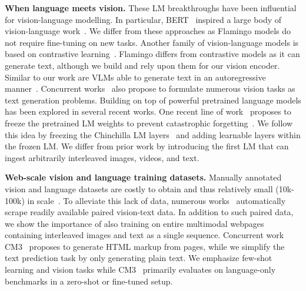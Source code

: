 \textbf{When language meets vision.} These LM breakthroughs have been influential for vision-language modelling. In particular, BERT~\citep{bert} inspired a large body of vision-language work~\citep{lu2019vilbert,su2019vl,chen2020uniter,hendricks2021decoupling,wang2021vlmo,li2020oscar,tan2019lxmert,zhu2020actbert,wang2021ufo,li2020hero,gan2020large,fu2021violet,zellers2021merlot,zellers2022merlot,singh2021flava,sun2019videobert}. We differ from these approaches as Flamingo models do not require fine-tuning on new tasks. Another family of vision-language models is based on contrastive learning~\citep{alayrac2020self,clip,align,zhai2021lit,pham2021combined,miech2020end,bain2021frozen,yuan2021florence,li2021align,yao2021filip,jain2021mural}. Flamingo differs from contrastive models as it can generate text, although we build and rely upon them for our vision encoder. Similar to our work are VLMs able to generate text in an autoregressive manner~\citep{vinyals2015show,donahue2015long,luo2020univl,hu2021scaling,dai2022}. Concurrent works~\citep{wang2021simvlm,cho2021unifying,wang2022unifying,zhu2021uni,li2022blip} also propose to formulate numerous vision tasks as text generation problems. Building on top of powerful pretrained language models has been explored in several recent works. One recent line of work~\citep{tsimpoukelli2021multimodal,eichenberg2021magma,mokady2021clipcap,luo2022vc,yang2021empirical,zeng2022socraticmodels} proposes to freeze the pretrained LM weights to prevent catastrophic forgetting~\citep{mccloskey1989catastrophic}. We follow this idea by freezing the Chinchilla LM layers~\citep{chinchilla} and adding learnable layers within the frozen LM. We differ from prior work by introducing the first LM that can ingest arbitrarily interleaved images, videos, and text.

\textbf{Web-scale vision and language training datasets.} Manually annotated vision and language datasets are costly to obtain and thus relatively small (10k-100k) in scale~\citep{young2014image,chen2015microsoft,antol2015vqa,marino2019ok,wang2019vatex,xiao2021next}. To alleviate this lack of data, numerous works~\citep{align,sharma2018conceptual,changpinyo2021conceptual,thomee2016yfcc100m} automatically scrape readily available paired vision-text data. In addition to such paired data, we show the importance of also training on entire multimodal webpages containing interleaved images and text as a single sequence. Concurrent work CM3~\citep{aghajanyan2022cm3} proposes to generate HTML markup from pages, while we simplify the text prediction task by only generating plain text. We emphasize few-shot learning and vision tasks while CM3~\citep{aghajanyan2022cm3} primarily evaluates on language-only benchmarks in a zero-shot or fine-tuned setup.

